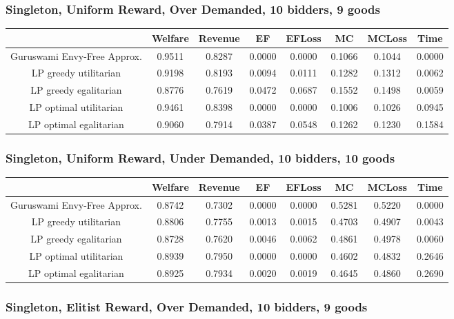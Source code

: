 \subsubsection*{Singleton, Uniform Reward, Over Demanded, 10 bidders, 9 goods} 
\begin{tabular}{|c|c|c|c|c|c|c|c|}\hline
                            	&Welfare	&Revenue	&EF	&EFLoss	&MC	&MCLoss	&Time	\\\hline
   Guruswami Envy-Free Approx.	&0.9511	&0.8287	&0.0000	&0.0000	&0.1066	&0.1044	&0.0000	\\\hline 
         LP greedy utilitarian	&0.9198	&0.8193	&0.0094	&0.0111	&0.1282	&0.1312	&0.0062	\\\hline 
         LP greedy egalitarian	&0.8776	&0.7619	&0.0472	&0.0687	&0.1552	&0.1498	&0.0059	\\\hline 
        LP optimal utilitarian	&0.9461	&0.8398	&0.0000	&0.0000	&0.1006	&0.1026	&0.0945	\\\hline 
        LP optimal egalitarian	&0.9060	&0.7914	&0.0387	&0.0548	&0.1262	&0.1230	&0.1584	\\\hline 
\end{tabular}\subsubsection*{Singleton, Uniform Reward, Under Demanded, 10 bidders, 10 goods} 
\begin{tabular}{|c|c|c|c|c|c|c|c|}\hline
                            	&Welfare	&Revenue	&EF	&EFLoss	&MC	&MCLoss	&Time	\\\hline
   Guruswami Envy-Free Approx.	&0.8742	&0.7302	&0.0000	&0.0000	&0.5281	&0.5220	&0.0000	\\\hline 
         LP greedy utilitarian	&0.8806	&0.7755	&0.0013	&0.0015	&0.4703	&0.4907	&0.0043	\\\hline 
         LP greedy egalitarian	&0.8728	&0.7620	&0.0046	&0.0062	&0.4861	&0.4978	&0.0060	\\\hline 
        LP optimal utilitarian	&0.8939	&0.7950	&0.0000	&0.0000	&0.4602	&0.4832	&0.2646	\\\hline 
        LP optimal egalitarian	&0.8925	&0.7934	&0.0020	&0.0019	&0.4645	&0.4860	&0.2690	\\\hline 
\end{tabular}\subsubsection*{Singleton, Elitist Reward, Over Demanded, 10 bidders, 9 goods} 
